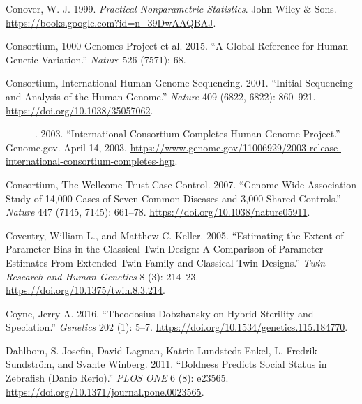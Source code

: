 \documentclass[
]{book}
\newlength{\cslhangindent}
\newlength{\cslentryspacingunit} %
\newenvironment{CSLReferences}[2] %
 {%
  \setlength{\parindent}{0pt}
  \ifodd #1
  \let\oldpar\par
  \def\par{\hangindent=\cslhangindent\oldpar}
  \fi
  \setlength{\parskip}{#2\cslentryspacingunit}
 }%
 {}
\begin{document}
\begin{CSLReferences}{1}{0}
\leavevmode{}%
Conover, W. J. 1999. \emph{Practical {Nonparametric Statistics}}. {John Wiley \& Sons}. \url{https://books.google.com?id=n_39DwAAQBAJ}.

\leavevmode{}%
Consortium, 1000 Genomes Project et al. 2015. {``A Global Reference for Human Genetic Variation.''} \emph{Nature} 526 (7571): 68.

\leavevmode{}%
Consortium, International Human Genome Sequencing. 2001. {``Initial Sequencing and Analysis of the Human Genome.''} \emph{Nature} 409 (6822, 6822): 860--921. \url{https://doi.org/10.1038/35057062}.

\leavevmode{}%
---------. 2003. {``International {Consortium Completes Human Genome Project}.''} {Genome.gov}. April 14, 2003. \url{https://www.genome.gov/11006929/2003-release-international-consortium-completes-hgp}.

\leavevmode{}%
Consortium, The Wellcome Trust Case Control. 2007. {``Genome-Wide Association Study of 14,000 Cases of Seven Common Diseases and 3,000 Shared Controls.''} \emph{Nature} 447 (7145, 7145): 661--78. \url{https://doi.org/10.1038/nature05911}.

\leavevmode{}%
Coventry, William L., and Matthew C. Keller. 2005. {``Estimating the {Extent} of {Parameter Bias} in the {Classical Twin Design}: {A Comparison} of {Parameter Estimates From Extended Twin-Family} and {Classical Twin Designs}.''} \emph{Twin Research and Human Genetics} 8 (3): 214--23. \url{https://doi.org/10.1375/twin.8.3.214}.

\leavevmode{}%
Coyne, Jerry A. 2016. {``Theodosius {Dobzhansky} on {Hybrid Sterility} and {Speciation}.''} \emph{Genetics} 202 (1): 5--7. \url{https://doi.org/10.1534/genetics.115.184770}.

\leavevmode{}%
Dahlbom, S. Josefin, David Lagman, Katrin Lundstedt-Enkel, L. Fredrik Sundström, and Svante Winberg. 2011. {``Boldness {Predicts Social Status} in {Zebrafish} ({Danio} Rerio).''} \emph{PLOS ONE} 6 (8): e23565. \url{https://doi.org/10.1371/journal.pone.0023565}.


\end{CSLReferences}
\end{document}
